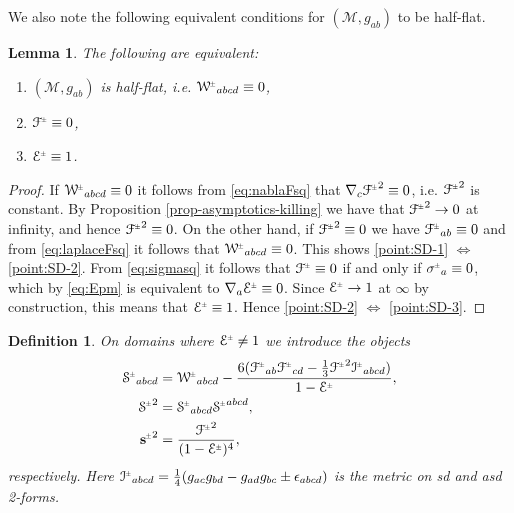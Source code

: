 \documentclass[a4paper,10pt,reqno]{amsart}
\newcommand{\Scal}{\mathop{\rm Scal}}
\newcommand{\cE}{\mathcal{E}}
\newcommand{\cM}{\mathcal{M}}
\theoremstyle{plain}
\newtheorem{lemma}[thm]{Lemma}
\newtheorem{definition}[thm]{Definition}
\newcommand{\PM}[1]{{{#1}^{\hspace{-.5pt}\scaleto{\pm}{3.5pt}}}}
\def\Wcal{\mathcal{W}}
\def\Fcal{\mathcal{F}}
\def\Ecal{\mathcal{E}}
\def\Scal{\mathcal{S}}
\def\Ical{\mathcal{I}}
\def\sbold{\mathbf{s}}
\numberwithin{equation}{section}
\begin{document}
We also note the following equivalent conditions for $(\cM, g_{ab})$ to be half-flat. 
\begin{lemma} \label{prop:SD-characterizations}
The following are equivalent:
\begin{enumerate} 
\item \label{point:SD-1} $(\cM, g_{ab})$ is half-flat, i.e. $\PM{\Wcal}_{abcd} \equiv 0$,
\item \label{point:SD-2} $\PM{\Fcal} \equiv 0$, 
\item \label{point:SD-3} $\PM{\cE} \equiv 1$.
\end{enumerate}
\end{lemma}

\begin{proof}
If $\PM{\Wcal}_{abcd} \equiv 0$ it follows from \eqref{eq:nablaFsq} that $\nabla_{c}\PM{\Fcal}^2 \equiv 0$, i.e. $\PM{\Fcal}^2$ is constant. By Proposition \ref{prop-asymptotics-killing} we have that $\PM{\Fcal}^2 \to 0$ at infinity, and hence $\PM{\Fcal}^2 \equiv 0$.
On the other hand, if $\PM{\Fcal}^2 \equiv 0$ we have $\PM{\Fcal}_{ab} \equiv 0$ and from \eqref{eq:laplaceFsq} it follows that $\PM{\Wcal}_{abcd} \equiv 0$. This shows \eqref{point:SD-1} $\Leftrightarrow$ \eqref{point:SD-2}. 
From \eqref{eq:sigmasq} it follows that $\PM{\Fcal} \equiv 0$ if and only if $\PM{\sigma}_{a} \equiv 0$, which by \eqref{eq:Epm} is equivalent to  $\nabla_{a}\PM{\Ecal} \equiv 0$. Since $\PM{\Ecal} \to 1$ at $\infty$ by construction, this means that $\PM{\Ecal} \equiv 1$. Hence \eqref{point:SD-2} $\Leftrightarrow$ \eqref{point:SD-3}.  
\end{proof}



\begin{definition}\label{def:mst}
On domains where $\PM{\Ecal} \neq 1$ we introduce the objects
\begin{subequations}
\begin{align}
\label{mst}
\PM{\Scal}_{abcd}={}&\PM{\Wcal}_{abcd} - \frac{6 (\PM{\Fcal}_{ab} \PM{\Fcal}_{cd} -  \tfrac{1}{3} \PM{\Fcal}^2 \PM{\Ical}_{abcd})}{1 -  \PM{\Ecal}}, \\
\PM{\Scal}^2={}&\PM{\Scal}_{abcd} \PM{\Scal}^{abcd}, \\
\PM{\sbold}^2={}&\frac{\PM{\Fcal}^2}{(1 -  \PM{\Ecal})^4}, \label{eq:MSscalar}
\end{align}
\end{subequations}
respectively. Here $\PM{\Ical}_{abcd}= \tfrac{1}{4} ( g_{ac} g_{bd} -  g_{ad} g_{bc} \pm \epsilon_{abcd} )$ is the metric on sd and asd 2-forms.
\end{definition}
\end{document}
